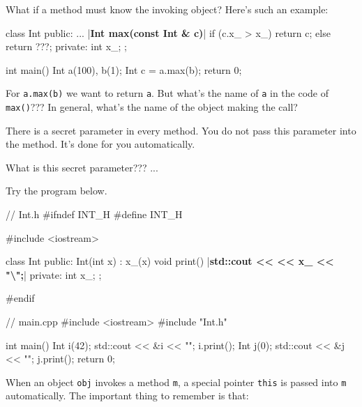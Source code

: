 \newpage{}

What if a method must know the invoking object? Here's
such an example:

\begin{consolethree}[escapeinside=||]
class Int
{
public:
    ...
    |\textbf{Int max(const Int \& c)}|
    {
        if (c.x_ > x_)
        {
            return c;
        }
        else
        {
            return ???;
        }
    }
private:
    int x_;
};
\end{consolethree}

\begin{consolethree}[escapeinside=||]
int main()
{
    Int a(100), b(1);
    Int c = a.max(b);
    return 0;
}
\end{consolethree}

For \texttt{a.max(b)} we want to return \texttt{a}. But what's the name of
\texttt{a} in the code of \texttt{max()}??? In general, what's the name of
the object making the call?

There is a secret parameter in every method. You do not pass this
parameter into the method. It's done for you automatically.

What is this secret parameter??? ...


\newpage{}

Try the program below.

\begin{consolethree}[escapeinside=||]
// Int.h
#ifndef INT_H
#define INT_H

#include <iostream>

class Int
{
public:
    Int(int x) : x_(x) {}
    void print()
    {
        |\textbf{std::cout <<  << x\_ << "\textbackslash ";}|
    }
private:
    int x_;
};

#endif
\end{consolethree}

\begin{consolethree}[escapeinside=||]
// main.cpp
#include <iostream>
#include "Int.h"

int main()
{
    Int i(42);
    std::cout << &i << "\n";
    i.print();
    Int j(0);
    std::cout << &j << "\n";
    j.print();
    return 0;
}
\end{consolethree}

When an object \texttt{obj} invokes a method \texttt{m}, a special pointer
\texttt{this} is passed into \texttt{m} automatically. The important thing
to remember is that:

